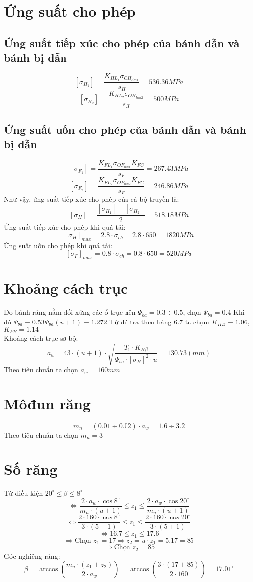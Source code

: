 \section{Ứng suất cho phép}
\subsection{Ứng suất tiếp xúc cho phép của bánh dẫn và bánh bị dẫn}
\[
    [\sigma_{H_1}] = \frac{K_{HL_1}\sigma_{OH_{lim1}}}{s_H} = 536.36MPa
\]
\[
    [\sigma_{H_2}] = \frac{K_{HL_2}\sigma_{OH_{lim2}}}{s_H} = 500MPa
\]
\subsection{Ứng suất uốn cho phép của bánh dẫn và bánh bị dẫn}
\[
    [\sigma_{F_1}] = \frac{K_{FL_1}\sigma_{OF_{lim1}}K_{FC}}{s_F} = 267.43MPa
\]
\[
    [\sigma_{F_2}] = \frac{K_{FL_2}\sigma_{OF_{lim2}}K_{FC}}{s_F} = 246.86MPa
\]
Như vậy, ứng suất tiếp xúc cho phép của cả bộ truyền là:
\[
    [\sigma_H] = \frac{[\sigma_{H_1}] + [\sigma_{H_2}]}{2} = 518.18MPa 
\]
Ứng suất tiếp xúc cho phép khi quá tải:
\[
    [\sigma_H]_{max} = 2.8 \cdot \sigma_{ch} = 2.8 \cdot 650 = 1820MPa
\]
Ứng suất uốn cho phép khi quá tải:
\[
    [\sigma_F]_{max} = 0.8 \cdot \sigma_{ch} = 0.8 \cdot 650 = 520MPa
\]

\section{Khoảng cách trục}
Do bánh răng nằm đối xứng các ổ trục nên $\Psi_{ba} = 0.3 \div 0.5$, chọn $\Psi_{ba} = 0.4$  
Khi đó $\Psi_{bd} = 0.53\Psi_{ba}(u+1) = 1.272$  
Từ đó tra theo bảng 6.7 \cite{reference} ta chọn: $K_{HB} = 1.06$, $K_{FB} = 1.14$  \\
Khoảng cách trục sơ bộ:
\[
a_w = 43 \cdot (u+1) \cdot \sqrt{\frac{T_1 \cdot K_{H\beta}}{\Psi_{ba} \cdot [\sigma_H]^2 \cdot u}} = 130.73(mm)
\]
Theo tiêu chuẩn ta chọn $a_w = 160mm$

\section{Môđun răng}

\[
m_n = (0.01 \div 0.02) \cdot a_w = 1.6 \div 3.2
\]
Theo tiêu chuẩn ta chọn $m_n = 3$
\section{Số răng}
Từ điều kiện $20^\circ \leq \beta \leq 8^\circ$
\[
\Leftrightarrow \frac{2 \cdot a_w \cdot \cos 8^\circ}{m_n \cdot (u+1)} \leq z_1 \leq \frac{2 \cdot a_w \cdot \cos 20^\circ}{m_n \cdot (u+1)}
\]
\[
\Leftrightarrow \frac{2 \cdot 160 \cdot \cos 8^\circ}{3 \cdot (5+1)} \leq z_1 \leq \frac{2 \cdot 160 \cdot \cos 20^\circ}{3 \cdot (5+1)}
\]
\[
\Leftrightarrow 16.7 \leq z_1 \leq 17.6
\]
\[
\Rightarrow \text{Chọn } z_1 = 17 \Rightarrow z_2 = u \cdot z_1 = 5.17 = 85
\]
\[
\Rightarrow \text{Chọn } z_2 = 85
\]
Góc nghiêng răng:
\[
\beta = \arccos \left( \frac{m_n \cdot (z_1 + z_2)}{2 \cdot a_w} \right) = \arccos \left( \frac{3 \cdot (17+85)}{2 \cdot 160} \right) = 17.01^\circ
\]


